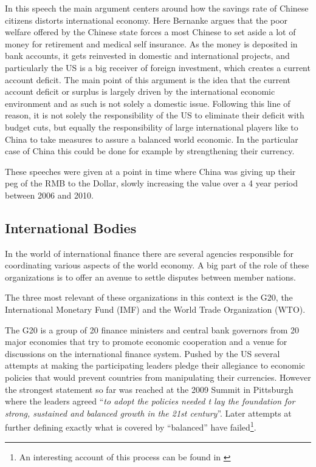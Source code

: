 In this speech the main argument centers around how the savings rate 
of Chinese citizens distorts international economy. Here Bernanke argues 
that the poor welfare offered by the Chinese state forces a most Chinese 
to set aside a lot of money for retirement and medical self insurance.  
As the money is deposited in bank accounts, it gets reinvested in 
domestic and international projects, and particularly the US is a big 
receiver of foreign investment, which creates a current account deficit.  
The main point of this argument is the idea that the current account 
deficit or surplus is largely driven by the international economic 
environment and as such is not solely a domestic issue. Following this 
line of reason, it is not solely the responsibility of the US to 
eliminate their deficit with budget cuts, but equally the responsibility 
of large international players like to China to take measures to assure 
a balanced world economic. In the particular case of China this could be 
done for example by strengthening their currency.

These speeches were given at a point in time where China was giving up 
their peg of the RMB to the Dollar, slowly increasing the value over a 4 
year period between 2006 and 2010.

\subsection{International Bodies}

In the world of international finance there are several agencies 
responsible for coordinating various aspects of the world economy. A big 
part of the role of these organizations is to offer an avenue to settle 
disputes between member nations. %

The three most relevant of these organizations in this context is the 
G20, the International Monetary Fund (IMF) and the World Trade 
Organization (WTO).

The G20 is a group of 20 finance ministers and central bank governors 
from 20 major economies that try to promote economic cooperation and a 
venue for discussions on the international finance system. Pushed by the 
US several attempts at making the participating leaders pledge their 
allegiance to economic policies that would prevent countries from 
manipulating their currencies. However the strongest statement so far 
was reached at the 2009 Summit in Pittsburgh where the leaders agreed 
``\textit{to adopt the policies needed t lay the foundation for strong, 
sustained and balanced growth in the 21st century}''. Later attempts at 
further defining exactly what is covered by ``balanced'' have 
failed\footnote{An interesting account of this process can be found in 
\cite{Levy11}}.

